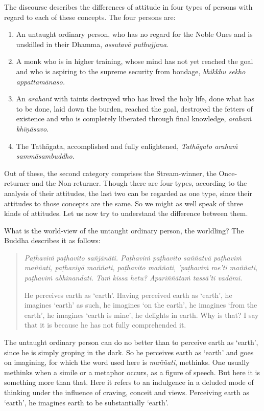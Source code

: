 The discourse describes the differences of attitude in four types of persons with regard to each of these concepts. The four persons are:

\begin{enumerate}
\def\labelenumi{\arabic{enumi}.}
\item
  An untaught ordinary person, who has no regard for the Noble Ones and is unskilled in their Dhamma, \emph{assutavā puthujjana}.
\item
  A monk who is in higher training, whose mind has not yet reached the goal and who is aspiring to the supreme security from bondage, \emph{bhikkhu sekho appattamānaso.}
\item
  An \emph{arahant} with taints destroyed who has lived the holy life, done what has to be done, laid down the burden, reached the goal, destroyed the fetters of existence and who is completely liberated through final knowledge, \emph{arahaṁ khīṇāsavo}.
\item
  The Tathāgata, accomplished and fully enlightened, \emph{Tathāgato arahaṁ sammāsambuddho}.
\end{enumerate}

Out of these, the second category comprises the Stream-winner, the Once-returner and the Non-returner. Though there are four types, according to the analysis of their attitudes, the last two can be regarded as one type, since their attitudes to those concepts are the same. So we might as well speak of three kinds of attitudes. Let us now try to understand the difference between them.

What is the world-view of the untaught ordinary person, the worldling? The Buddha describes it as follows:

\begin{quote}
\emph{Paṭhaviṁ paṭhavito sañjānāti. Paṭhaviṁ paṭhavito saññatvā paṭhaviṁ maññati, paṭhaviyā maññati, paṭhavito maññati, 'paṭhaviṁ me'ti maññati, paṭhaviṁ abhinandati. Taṁ kissa hetu? Apariññātaṁ tassā'ti vadāmi.}

He perceives earth as `earth'. Having perceived earth as `earth', he imagines `earth' as such, he imagines `on the earth', he imagines `from the earth', he imagines `earth is mine', he delights in earth. Why is that? I say that it is because he has not fully comprehended it.
\end{quote}

The untaught ordinary person can do no better than to perceive earth as `earth', since he is simply groping in the dark. So he perceives earth as `earth' and goes on imagining, for which the word used here is \emph{maññati}, methinks. One usually methinks when a simile or a metaphor occurs, as a figure of speech. But here it is something more than that. Here it refers to an indulgence in a deluded mode of thinking under the influence of craving, conceit and views. Perceiving earth as `earth', he imagines earth to be substantially `earth'.

